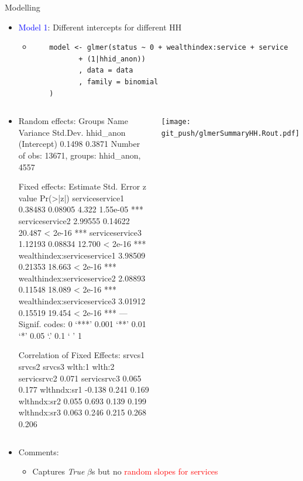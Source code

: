 \documentclass{beamer}
\begin{document}
\begin{frame}[fragile]{Modelling}
\begin{itemize}[<+->]
\item \textcolor{blue}{Model 1}: Different intercepts for different HH

\begin{itemize}[<+->]
\item[]
\tiny{
\begin{verbatim}
	model <- glmer(status ~ 0 + wealthindex:service + service 
		   + (1|hhid_anon))
		   , data = data
		   , family = binomial
	)
\end{verbatim}
}
\end{itemize}
\item[]
\begin{columns}[t]
\vspace{-4.5cm}
\begin{verbbox}
Random effects:
 Groups    Name        Variance Std.Dev.
 hhid_anon (Intercept) 0.1498   0.3871
Number of obs: 13671, groups:  hhid_anon, 4557

Fixed effects:
                            Estimate Std. Error z value Pr(>|z|)
serviceservice1              0.38483    0.08905   4.322 1.55e-05 ***
serviceservice2              2.99555    0.14622  20.487  < 2e-16 ***
serviceservice3              1.12193    0.08834  12.700  < 2e-16 ***
wealthindex:serviceservice1  3.98509    0.21353  18.663  < 2e-16 ***
wealthindex:serviceservice2  2.08893    0.11548  18.089  < 2e-16 ***
wealthindex:serviceservice3  3.01912    0.15519  19.454  < 2e-16 ***
---
Signif. codes:  0 ‘***’ 0.001 ‘**’ 0.01 ‘*’ 0.05 ‘.’ 0.1 ‘ ’ 1

Correlation of Fixed Effects:
            srvcs1 srvcs2 srvcs3 wlth:1 wlth:2
servicsrvc2  0.071
servicsrvc3  0.065  0.177
wlthndx:sr1 -0.138  0.241  0.169
wlthndx:sr2  0.055  0.693  0.139  0.199
wlthndx:sr3  0.063  0.246  0.215  0.268  0.206
\end{verbbox}
\resizebox{1\textwidth}{!}{\theverbbox}
\texttt{[image: git\_push/glmerSummaryHH.Rout.pdf]}
\end{columns}
\item Comments:
\begin{itemize}[<+>]
\item Captures \textit{True} $\beta$s but no \textcolor{red}{random slopes for services}
\end{itemize}
\end{itemize}
\end{frame}
\end{document}

